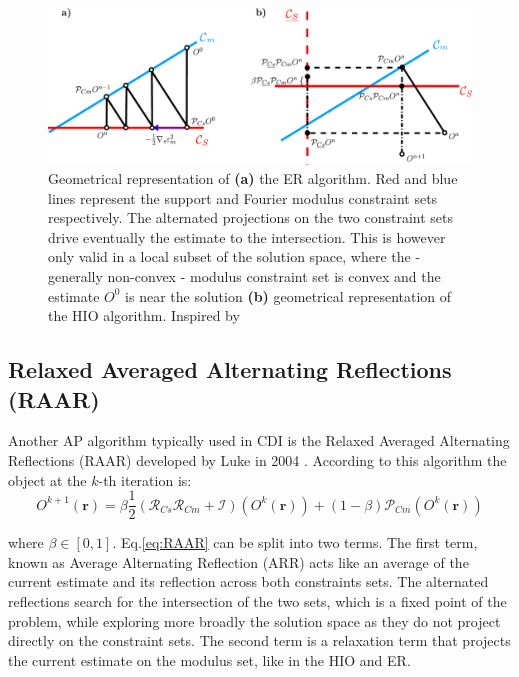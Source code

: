 \begin{figure}[H]
    \centering
    \includegraphics[width=\textwidth]{figures/Intro/ER_HIO.pdf}
    \caption{Geometrical representation of \textbf{(a)} the ER algorithm. Red and blue lines represent the support and 
    Fourier modulus constraint sets respectively. The alternated projections on the two constraint sets drive eventually 
    the estimate to the intersection. This is however only valid in a local subset of the solution space, where the -
    generally non-convex - modulus constraint set is convex and the estimate $O^{0}$ is near the solution \textbf{(b)} 
    geometrical representation of the HIO algorithm. Inspired by \cite{marchesini_unified_2007}}
    \label{fig:projections}
\end{figure}


\subsection{Relaxed Averaged Alternating Reflections (RAAR)}
Another AP algorithm typically used in CDI is the Relaxed Averaged Alternating Reflections (RAAR) developed by Luke 
in 2004 \cite{Luke_2004}. According to this algorithm the object at the $k$-th iteration is: 
\begin{equation}
    O^{k+1}(\mathbf{r}) =\beta\frac{1}{2}(\mathcal{R}_{Cs}\mathcal{R}_{Cm} + \mathcal{I})(O^{k}(\mathbf{r})) + (1-\beta)\mathcal{P}_{Cm}(O^{k}(\mathbf{r}))
    \label{eq:RAAR}
\end{equation}

where $\beta \in [0,1]$. 
Eq.\ref{eq:RAAR} can be split into two terms. The first term, known as Average Alternating Reflection (ARR) \cite{AAR_2004} 
acts like an average of the current estimate and its reflection across both constraints sets. The alternated reflections search 
for the intersection of the two sets, which is a fixed point of the problem, while exploring more broadly the solution 
space as they do not project directly on the constraint sets. The second term is a relaxation term that 
projects the current estimate on the modulus set, like in the HIO and ER. 

